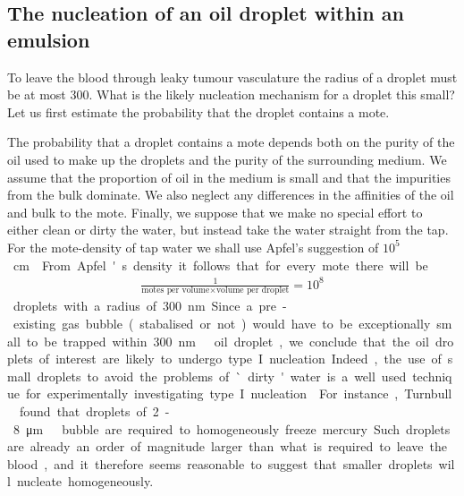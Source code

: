 \subsection{The nucleation of an oil droplet within an emulsion}


To leave the blood through leaky tumour vasculature the radius of a droplet must be at  most  \unit{300}\nano\metre\cite{Fukumori2006, Hashizume2000,  Hobbs1998}.
What is the likely nucleation mechanism for a droplet this small?
Let us first estimate the probability that the droplet contains a mote.

The probability that a droplet contains a mote depends both on the purity of the oil used to make up the droplets
and the purity of the surrounding medium.
We assume that the proportion of oil in the medium is small and that the impurities from the bulk dominate.
We also neglect any differences in the affinities of the oil and bulk to the mote.
Finally, we suppose that we make no special effort to either clean or dirty the water,
but instead take the water straight from the tap.
For the mote-density of tap water we shall use Apfel's\cite{Apfel1984} suggestion  of \unit{$10^5$}\centi\metre\rpcubed.

From Apfel's density it follows that for every mote there will be
\begin{align}
\frac{1}{\text{motes per volume}\times\text{volume per droplet}} = 10^8
\end{align} 
droplets with a radius of \unit{300}\nano\metre.
Since a pre-existing gas bubble (stabalised or not) would have to be exceptionally small to be trapped within \unit{300}\nano\metre\ oil droplet,
we conclude that  the oil droplets of interest are  likely to undergo type I nucleation.
Indeed, the use of small droplets to avoid the problems of `dirty' water is  a well used technique for experimentally investigating type I nucleation\cite{Turnbull1952, HongChul2005,Apfel1984}.
For instance, Turnbull\cite{1952} found that droplets of 2-\unit{8}\micro\metre\ bubble are required to homogeneously freeze mercury.  
Such droplets are already an order of magnitude larger than what is required to leave the blood,
and it therefore seems reasonable to suggest that smaller droplets will nucleate homogeneously.




